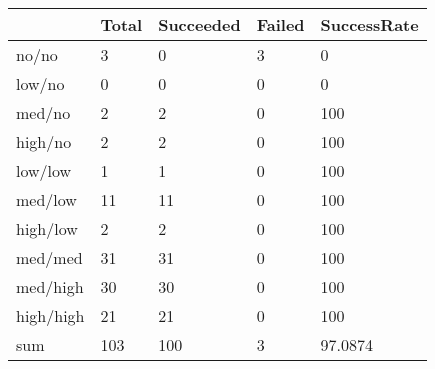 \begin{tabular}{lllll}
& Total & Succeeded & Failed & SuccessRate \\ 
\hline 
no/no & 3 & 0 & 3 & 0 \\ 
low/no & 0 & 0 & 0 & 0 \\ 
med/no & 2 & 2 & 0 & 100 \\ 
high/no & 2 & 2 & 0 & 100 \\ 
low/low & 1 & 1 & 0 & 100 \\ 
med/low & 11 & 11 & 0 & 100 \\ 
high/low & 2 & 2 & 0 & 100 \\ 
med/med & 31 & 31 & 0 & 100 \\ 
med/high & 30 & 30 & 0 & 100 \\ 
high/high & 21 & 21 & 0 & 100 \\ 
sum & 103 & 100 & 3 & 97.0874 \\ 
\hline 
\end{tabular}